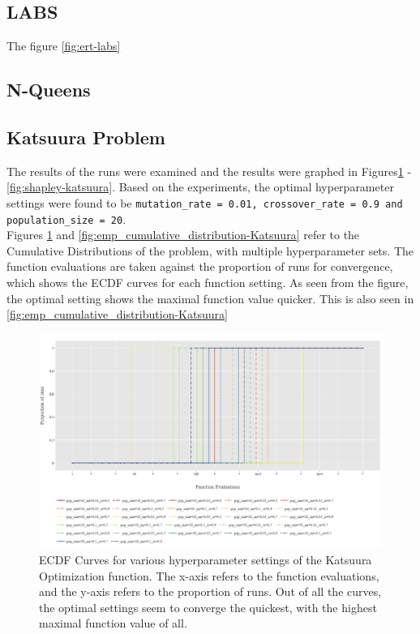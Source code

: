 \documentclass{article}
\begin{document}
\subsection{LABS}
The figure \ref{fig:ert-labs}
\label{fig:ert-labs}

\subsection{N-Queens}
\label{app:f23-runningtime}
\label{fig:ert-nqueens}

\subsection{Katsuura Problem}
The results of the runs were examined and the results were graphed in  Figures\ref{fig:cumulative_distribution-Katsuura} - \ref{fig:shapley-katsuura}. Based on the experiments, the optimal hyperparameter settings were found to be \texttt{mutation\_rate = 0.01, crossover\_rate = 0.9 and population\_size = 20}.\\
Figures \ref{fig:cumulative_distribution-Katsuura} and \ref{fig:emp_cumulative_distribution-Katsuura} refer to the Cumulative Distributions of the problem, with multiple hyperparameter sets. The function evaluations are taken against the proportion of runs for convergence, which shows the ECDF curves for each function setting. As seen from the figure, the optimal setting shows the maximal function value quicker. This is also seen in \ref{fig:emp_cumulative_distribution-Katsuura}
 \begin{figure}[h!]
    \centering
    \includegraphics[width=1\linewidth]{Graphs/Katsuura/Cumulative_Distribution.png}
    \caption{ECDF Curves for various hyperparameter settings of the Katsuura Optimization function. The x-axis refers to the function evaluations, and the y-axis refers to the proportion of runs. Out of all the curves, the optimal settings seem to converge the quickest, with the highest maximal function value of all. }
    \label{fig:cumulative_distribution-Katsuura}
\end{figure}
\end{document}
